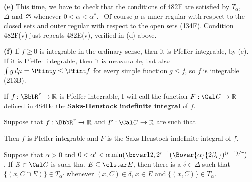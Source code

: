 {\medskip

{\bf (e)} This time, we have to check that the conditions of 482F are
satisfied by $T_{\alpha}$, $\Delta$ and $\frak R$ whenever
$0<\alpha<\alpha^*$.   \Prf\ Of course $\mu$
is inner regular with respect to the closed sets and outer regular with
respect to the open sets (134F).   Condition 482F(v) just repeats
482E(v), verified in (d) above.\ \Qed

\medskip

{\bf (f)} If $f\ge 0$ is integrable in the ordinary sense, then it is
Pfeffer integrable, by (e).   If it is Pfeffer integrable, then it is
measurable;  but also $\int g\,d\mu=\Pfint g\le\Pfint f$ for every
simple function $g\le f$, so $f$ is integrable (213B).
}%

 If $f:\BbbR^r\to\Bbb R$ is Pfeffer
integrable, I will call the function $F:\Cal C\to\Bbb R$ defined in
484Hc the {\bf Saks-Henstock indefinite integral} of $f$.

 Suppose that $f:\BbbR^r\to\Bbb R$ and
$F:\Cal C\to\Bbb R$ are such that


\noindent Then $f$ is Pfeffer integrable and $F$ is the Saks-Henstock
indefinite integral of $f$.


 Suppose that $\alpha>0$ and $0<\alpha'
<\alpha\min(\bover12,2^{r-1}(\Bover{\alpha}{2\beta_r})^{(r-1)/r})$.
If $E\in\Cal C$ is such that $E\subseteq\clstar E$, then there is a
$\delta\in\Delta$ such that $\{(x,C\cap E)\}\in T_{\alpha'}$ whenever
$(x,C)\in\delta$, $x\in E$ and $\{(x,C)\}\in T_{\alpha}$.

